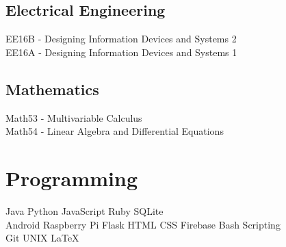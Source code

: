 \documentclass[]{format}
\begin{document}
\begin{minipage}[t]{0.33\textwidth}
\subsection{Electrical Engineering}
EE16B - Designing Information Devices and Systems 2 \\
EE16A - Designing Information Devices and Systems 1 \\

\subsection{Mathematics}
Math53 - Multivariable Calculus \\
Math54 - Linear Algebra and Differential Equations
\sectionsep


\section{Programming}
Java \textbullet{}   Python \textbullet{} JavaScript \textbullet{} Ruby \textbullet{}
SQLite \\
Android \textbullet{} Raspberry Pi \textbullet{} Flask \textbullet{} HTML \textbullet{} CSS \textbullet{} Firebase \textbullet{} Bash Scripting \\
Git \textbullet{} UNIX \textbullet{} LaTeX
\sectionsep

%
%

\end{minipage} 
\hfill
\end{document}

